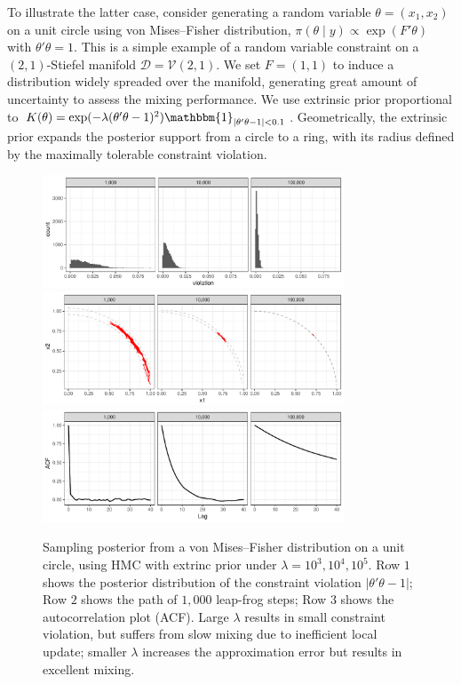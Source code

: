 \documentclass[10pt]{article}
\newcommand{\mc}[1]{\mathcal{#1}}
\begin{document}
To illustrate the latter case, consider generating a random variable $\theta=(x_1,x_2)$ on a unit circle using von Mises--Fisher distribution, $\pi(\theta \mid y) \propto \exp(F'\theta)$ with $\theta'\theta =1$. This is a simple example of a random variable constraint on a $(2,1)$-Stiefel manifold $\mc D =\mc V(2,1)$. We set $F=(1,1)$ to induce a distribution widely spreaded over the manifold, generating great amount of uncertainty to assess the mixing performance. We use extrinsic prior proportional to $K(\theta)= \exp(-\lambda (\theta'\theta -1)^2) \mathbbm{1}_{|\theta'\theta -1|<0.1}$. Geometrically, the extrinsic prior expands the posterior support from a circle to a ring, with its radius defined by the maximally tolerable constraint violation. 

\begin{figure}[H]
 \centering
    \includegraphics[width=0.8\textwidth]{unit_circle_violation}
  \includegraphics[width=0.8\textwidth]{unit_circle_100steps}
 \includegraphics[width=0.8\textwidth]{unit_circle_acf}
\caption{Sampling posterior from a von Mises--Fisher distribution on a unit circle, using HMC with extrinc prior under $\lambda=10^3,10^4,10^5$. Row $1$ shows the posterior distribution of the constraint violation $|\theta'\theta -1|$; Row $2$ shows the path of $1,000$ leap-frog steps; Row $3$ shows the autocorrelation plot (ACF). Large $\lambda$ results in small constraint violation, but suffers from slow mixing due to inefficient local update; smaller $\lambda$ increases the approximation error but results in excellent mixing.}
\label{unit_circle}
\end{figure}
\end{document}
